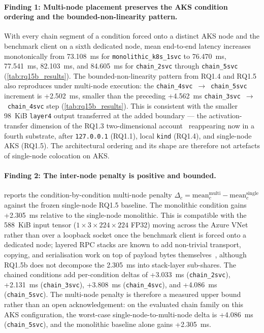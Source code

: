 \paragraph{Finding 1: Multi-node placement preserves the AKS condition ordering and the bounded-non-linearity pattern.}
With every chain segment of a condition forced onto a distinct AKS node and
the benchmark client on a sixth dedicated node, mean end-to-end latency
increases monotonically from 73.108~ms for
\texttt{monolithic\_k8s\_1svc} to 76.470~ms, 77.541~ms, 82.103~ms, and
84.605~ms for \texttt{chain\_2svc} through \texttt{chain\_5svc}
(\cref{tab:rq15b_results}). The bounded-non-linearity pattern from RQ1.4
and RQ1.5 also reproduces under multi-node execution: the
\texttt{chain\_4svc}~$\rightarrow$~\texttt{chain\_5svc} increment is
+2.502~ms, smaller than the preceding +4.562~ms
\texttt{chain\_3svc}~$\rightarrow$~\texttt{chain\_4svc} step
(\cref{tab:rq15b_results}). This is consistent with the smaller 98~KiB
\texttt{layer4} output transferred at the added boundary --- the
activation-transfer dimension of the RQ1.3 two-dimensional
account~\cite{deeperthings} reappearing now in a fourth substrate, after
\texttt{127.0.0.1} (RQ1.1), local \texttt{kind} (RQ1.4), and single-node
AKS (RQ1.5). The architectural ordering and its shape are therefore not
artefacts of single-node colocation on AKS.

\paragraph{Finding 2: The inter-node penalty is positive and bounded.}
 reports the condition-by-condition multi-node
penalty
$\Delta_c = \mathrm{mean}_c^{\mathrm{multi}} - \mathrm{mean}_c^{\mathrm{single}}$
against the frozen single-node RQ1.5 baseline. The monolithic condition
gains +2.305~ms relative to the single-node monolithic. This is compatible
with the 588~KiB input tensor ($1\times3\times224\times224$ FP32) moving
across the Azure VNet rather than over a loopback socket once the
benchmark client is forced onto a dedicated node; layered RPC stacks are
known to add non-trivial transport, copying, and serialisation work on
top of payload bytes themselves~\cite{rpc_overhead_hotos25}, although
RQ1.5b does not decompose the 2.305~ms into stack-layer sub-shares. The
chained conditions add per-condition deltas of +3.033~ms
(\texttt{chain\_2svc}), +2.131~ms (\texttt{chain\_3svc}), +3.808~ms
(\texttt{chain\_4svc}), and +4.086~ms (\texttt{chain\_5svc}). The
multi-node penalty is therefore a measured upper bound rather than an
open acknowledgement: on the evaluated chain family on this AKS
configuration, the worst-case single-node-to-multi-node delta is
+4.086~ms (\texttt{chain\_5svc}), and the monolithic baseline alone gains
+2.305~ms.

